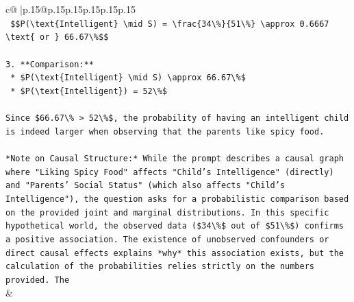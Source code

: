 \documentclass{article}
\begin{document}
{\begin{supertabular}{c@{$\;$}|p{.15\linewidth}@{}p{.15\linewidth}p{.15\linewidth}p{.15\linewidth}p{.15\linewidth}p{.15\linewidth}}
{{{\\ 
\texttt{    \$\$P(\textbackslash{}text\{Intelligent\} \textbackslash{}mid S) = \textbackslash{}frac\{34\textbackslash{}\%\}\{51\textbackslash{}\%\} \textbackslash{}approx 0.6667 \textbackslash{}text\{ or \} 66.67\textbackslash{}\%\$\$} \\
\\ 
\texttt{3.  **Comparison:**} \\
\texttt{    *   \$P(\textbackslash{}text\{Intelligent\} \textbackslash{}mid S) \textbackslash{}approx 66.67\textbackslash{}\%\$} \\
\texttt{    *   \$P(\textbackslash{}text\{Intelligent\}) = 52\textbackslash{}\%\$} \\
\\ 
\texttt{Since \$66.67\textbackslash{}\% > 52\textbackslash{}\%\$, the probability of having an intelligent child is indeed larger when observing that the parents like spicy food.} \\
\\ 
\texttt{*Note on Causal Structure:* While the prompt describes a causal graph where "Liking Spicy Food" affects "Child's Intelligence" (directly) and "Parents' Social Status" (which also affects "Child's Intelligence"), the question asks for a probabilistic comparison based on the provided joint and marginal distributions. In this specific hypothetical world, the observed data (\$34\textbackslash{}\%\$ out of \$51\textbackslash{}\%\$) confirms a positive association. The existence of unobserved confounders or direct causal effects explains *why* this association exists, but the calculation of the probabilities relies strictly on the numbers provided. The} \\
            }
        }
    }
    & \\ \\


\end{supertabular}}
\end{document}
